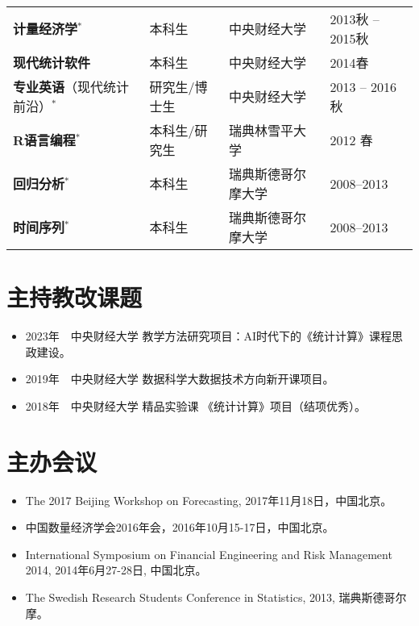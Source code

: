 \documentclass[twoside,a4paper,11pt]{article}
\begin{document}
\begin{tabular}{l l ll}
  \textbf{计量经济学}$^*$                   & 本科生        & 中央财经大学                   & 2013秋 -- 2015秋 \\
  \textbf{现代统计软件}                     & 本科生        & 中央财经大学                   & 2014春           \\
  \textbf{专业英语}（现代统计前沿）$^*$     & 研究生/博士生 & 中央财经大学                   & 2013 -- 2016秋   \\
  \textbf{R语言编程}$^*$                    & 本科生/研究生 & 瑞典林雪平大学                 & 2012 春          \\
  \textbf{回归分析}$^*$                     & 本科生        & 瑞典斯德哥尔摩大学             & 2008--2013       \\
  \textbf{时间序列}$^*$                     & 本科生        & 瑞典斯德哥尔摩大学             & 2008--2013       \\
\bottomrule
\end{tabular}

\section*{主持教改课题}

\begin{itemize}
\item 2023年~~中央财经大学 教学方法研究项目：AI时代下的《统计计算》课程思政建设。
\item 2019年~~中央财经大学 数据科学大数据技术方向新开课项目。
\item 2018年~~中央财经大学 精品实验课 《统计计算》项目（结项优秀）。
\end{itemize}

\section*{主办会议}

\begin{itemize}


\item  The 2017 Beijing Workshop on Forecasting, 2017年11月18日，中国北京。
\item 中国数量经济学会2016年会，2016年10月15-17日，中国北京。

\item International Symposium on Financial Engineering and Risk Management 2014,
  2014年6月27-28日, 中国北京。

\item The Swedish Research Students Conference in Statistics, 2013, 瑞典斯德哥尔摩。
\end{itemize}
\end{document}
